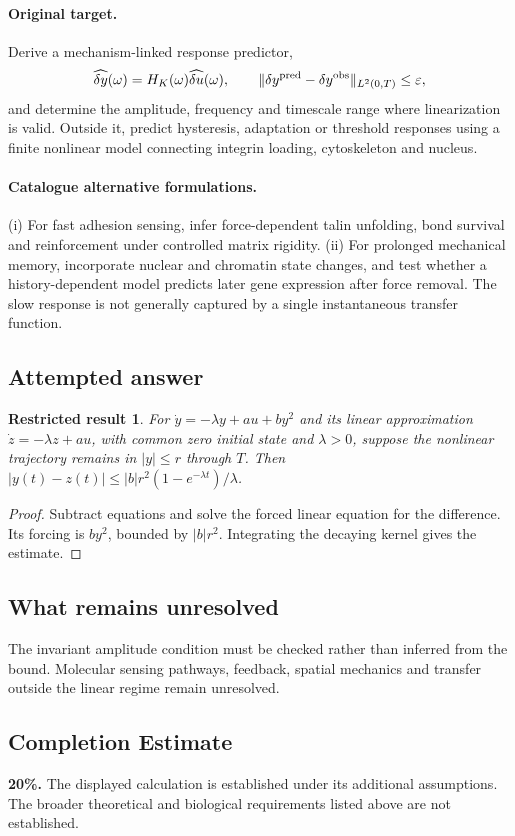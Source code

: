 \documentclass[11pt]{article}
\newtheorem{attemptresult}{Restricted result}[section]
\begin{document}
\paragraph{Original target.}
Derive a mechanism-linked response predictor,
\[\widehat{\delta y}(\omega)=H_K(\omega)\widehat{\delta u}(\omega),\qquad \|\delta y^{\rm pred}-\delta y^{\rm obs}\|_{L^2(0,T)}\le\varepsilon,\]
and determine the amplitude, frequency and timescale range where linearization is valid. Outside it, predict hysteresis, adaptation or threshold responses using a finite nonlinear model connecting integrin loading, cytoskeleton and nucleus.
\paragraph{Catalogue alternative formulations.}
(i) For fast adhesion sensing, infer force-dependent talin unfolding, bond survival and reinforcement under controlled matrix rigidity. (ii) For prolonged mechanical memory, incorporate nuclear and chromatin state changes, and test whether a history-dependent model predicts later gene expression after force removal. The slow response is not generally captured by a single instantaneous transfer function.
\subsection{Attempted answer}
\begin{attemptresult}
For $\dot y=-\lambda y+au+by^2$ and its linear approximation $\dot z=-\lambda z+au$, with common zero initial state and $\lambda>0$, suppose the nonlinear trajectory remains in $|y|\leq r$ through $T$. Then $|y(t)-z(t)|\leq |b|r^2(1-e^{-\lambda t})/\lambda$.
\end{attemptresult}
\begin{proof}
Subtract equations and solve the forced linear equation for the difference. Its forcing is $by^2$, bounded by $|b|r^2$. Integrating the decaying kernel gives the estimate.
\end{proof}
\subsection{What remains unresolved}
The invariant amplitude condition must be checked rather than inferred from the bound. Molecular sensing pathways, feedback, spatial mechanics and transfer outside the linear regime remain unresolved.
\subsection{Completion Estimate}
\textbf{20\%.} The displayed calculation is established under its additional assumptions. The broader theoretical and biological requirements listed above are not established.
\end{document}
